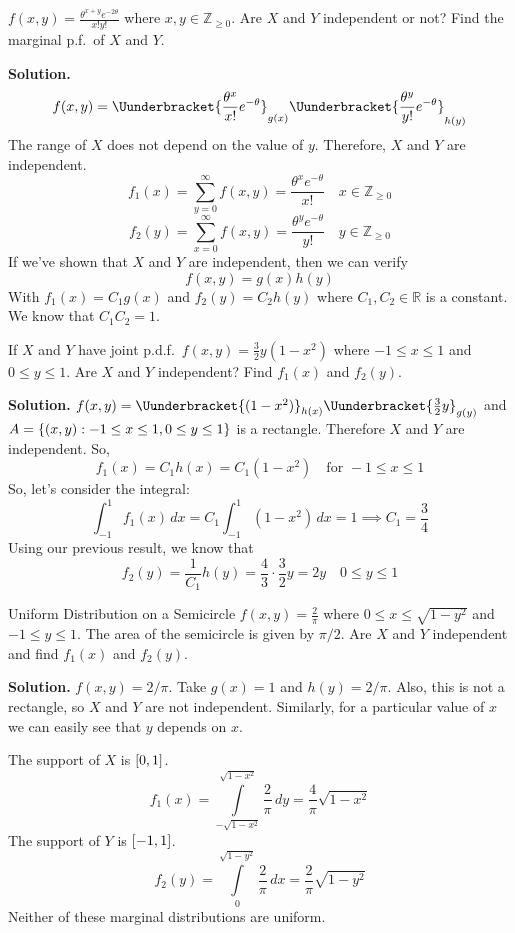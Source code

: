 \begin{Example}{}{}
    $ \displaystyle f(x,y)=\frac{\theta^{x+y}e^{-2\theta}}{x!y!} $
    where $ x,y\in\mathbb{Z}_{\ge 0} $. Are $ X $ and $ Y $
    independent or not? Find the marginal p.f.\ of $ X $ and $ Y $.

    \textbf{Solution.}
    \[ f(x,y)=\Uunderbracket{\frac{\theta^x}{x!} e^{-\theta}}_{g(x)}
        \Uunderbracket{\frac{\theta^y}{y!}e^{-\theta} }_{h(y)} \]
    The range of $ X $ does not depend on the value of $ y $. Therefore,
    $ X $ and $ Y $ are independent.
    \[ f_1(x)=\sum\limits_{y=0}^{\infty} f(x,y)=\frac{\theta^x e^{-\theta}}{x!}\quad x\in
        \mathbb{Z}_{\ge 0} \]
    \[ f_2(y)=\sum\limits_{x=0}^{\infty} f(x,y)=\frac{\theta^y e^{-\theta}}{y!}\quad y\in
        \mathbb{Z}_{\ge 0} \]
    If we've shown that $ X $ and $ Y $ are independent, then we can verify
    \[ f(x,y)=g(x)h(y) \]
    With $ f_1(x)=C_1 g(x) $ and $ f_2(y)=C_2 h(y) $
    where $ C_1,C_2\in\mathbb{R} $ is a constant. We know that $ C_1C_2=1 $.
\end{Example}

\begin{Example}{}{}
    If $ X $ and $ Y $ have joint p.d.f.\
    $ \displaystyle  f(x,y)=\frac{3}{2} y(1-x^2) $
    where $ -1\le x\le 1 $ and $ 0\le y\le 1 $.
    Are $ X $ and $ Y $ independent? Find $ f_1(x) $ and $ f_2(y) $.

    \textbf{Solution.}
    $ f(x,y)=\Uunderbracket{(1-x^2)}_{h(x)} \Uunderbracket{\frac{3}{2} y}_{g(y)} $
    and $ A =\{(x,y):-1\le x\le 1,0\le y\le 1\} $
    is a rectangle. Therefore $ X $ and $ Y $ are independent. So,
    \[ f_1(x)=C_1h(x)=C_1(1-x^2)\quad\text{for }-1\le x\le 1 \]
    So, let's consider the integral:
    \[ \int_{-1}^{1} f_1(x)\, d{x} =C_1
        \int_{-1}^{1} (1-x^2)\, d{x} =1
        \implies C_1=\frac{3}{4} \]
    Using our previous result, we know that
    \[ f_2(y)=\frac{1}{C_1} h(y)=\frac{4}{3}\cdot \frac{3}{2} y=2y
        \quad 0\le y\le 1 \]
\end{Example}

\begin{Example}{Uniform Distribution on a Semicircle}{}
    $ \displaystyle f(x,y)=\frac{2}{\pi} $ where $ 0\le x\le \sqrt{1-y^2} $
    and $ -1\le y\le 1 $. The area of the semicircle
    is given by $ \pi/2 $. Are $ X $ and $ Y $ independent and find
    $ f_1(x) $ and $ f_2(y) $.

    \textbf{Solution.} $ f(x,y)=2/\pi $.
    Take $ g(x)=1 $ and $ h(y)=2/\pi $. Also,
    this is not a rectangle, so $ X $ and $ Y $ are not independent.
    Similarly, for a particular value of $ x $
    we can easily see that $ y $ depends on $ x $.

    The support of $ X $ is $ \interval{0}{1} $.
    \[ f_1(x)=\int\limits_{-\sqrt{1-x^2}}^{\sqrt{1-x^2}} \frac{2}{\pi} \, d{y}=
        \frac{4}{\pi}\sqrt{1-x^2}  \]
    The support of $ Y $ is $ \interval{-1}{1} $.
    \[ f_2(y)=
        \int\limits_{0}^{\sqrt{1-y^2}} \frac{2}{\pi} \, d{x}=
        \frac{2}{\pi} \sqrt{1-y^2}  \]
    Neither of these marginal distributions are uniform.
\end{Example}
